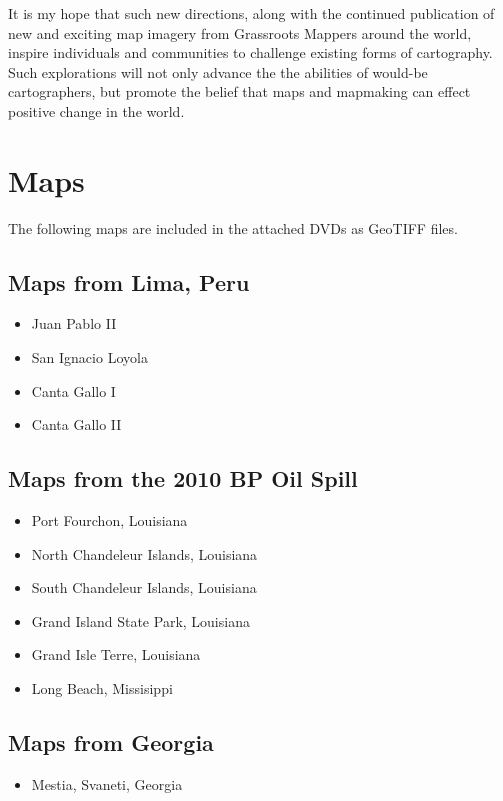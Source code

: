 \documentclass[11pt,oneside,notitlepage]{report}
\begin{document}
It is my hope that such new directions, along with the continued publication of new and exciting map imagery from Grassroots Mappers around the world, inspire individuals and communities to challenge existing forms of cartography. Such explorations will not only advance the the abilities of would-be cartographers, but promote the belief that maps and mapmaking can effect positive change in the world.  

\appendix

\chapter{Maps}

The following maps are included in the attached DVDs as \ac{GeoTIFF} files.

\section{Maps from Lima, Peru}

\begin{itemize}
\item{Juan Pablo II}
\item{San Ignacio Loyola}
\item{Canta Gallo I}
\item{Canta Gallo II}
\end{itemize}

\section{Maps from the 2010 BP Oil Spill}

\begin{itemize}
\item{Port Fourchon, Louisiana}
\item{North Chandeleur Islands, Louisiana}
\item{South Chandeleur Islands, Louisiana}
\item{Grand Island State Park, Louisiana}
\item{Grand Isle Terre, Louisiana}
\item{Long Beach, Missisippi}
\end{itemize}

\section{Maps from Georgia}

\begin{itemize}
\item{Mestia, Svaneti, Georgia}
\end{itemize}
\end{document}
